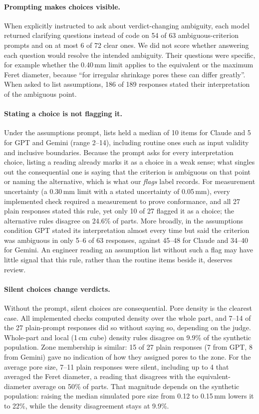 \documentclass[letterpaper]{article} %
\begin{document}
\paragraph{Prompting makes choices visible.} When explicitly instructed to ask about verdict-changing ambiguity, each model returned clarifying questions instead of code on 54 of 63 ambiguous-criterion prompts and on at most 6 of 72 clear ones. We did not score whether answering each question would resolve the intended ambiguity. Their questions were specific, for example whether the 0.40\,mm limit applies to the equivalent or the maximum Feret diameter, because ``for irregular shrinkage pores these can differ greatly''. When asked to list assumptions, 186 of 189 responses stated their interpretation of the ambiguous point.

\paragraph{Stating a choice is not flagging it.} Under the assumptions prompt, lists held a median of 10 items for Claude and 5 for GPT and Gemini (range 2--14), including routine ones such as input validity and inclusive boundaries. Because the prompt asks for every interpretation choice, listing a reading already marks it as a choice in a weak sense; what singles out the consequential one is saying that the criterion is ambiguous on that point or naming the alternative, which is what our \emph{flags} label records. For measurement uncertainty (a 0.30\,mm limit with a stated uncertainty of 0.05\,mm), every implemented check required a measurement to prove conformance, and all 27 plain responses stated this rule, yet only 10 of 27 flagged it as a choice; the alternative rules disagree on 24.6\% of parts. More broadly, in the assumptions condition GPT stated its interpretation almost every time but said the criterion was ambiguous in only 5--6 of 63 responses, against 45--48 for Claude and 34--40 for Gemini. An engineer reading an assumption list without such a flag may have little signal that this rule, rather than the routine items beside it, deserves review.

\paragraph{Silent choices change verdicts.} Without the prompt, silent choices are consequential. Pore density is the clearest case. All implemented checks computed density over the whole part, and 7--14 of the 27 plain-prompt responses did so without saying so, depending on the judge. Whole-part and local (1\,cm cube) density rules disagree on 9.9\% of the synthetic population. Zone membership is similar: 15 of 27 plain responses (7 from GPT, 8 from Gemini) gave no indication of how they assigned pores to the zone. For the average pore size, 7--11 plain responses were silent, including up to 4 that averaged the Feret diameter, a reading that disagrees with the equivalent-diameter average on 50\% of parts. That magnitude depends on the synthetic population: raising the median simulated pore size from 0.12 to 0.15\,mm lowers it to 22\%, while the density disagreement stays at 9.9\%.
\end{document}
